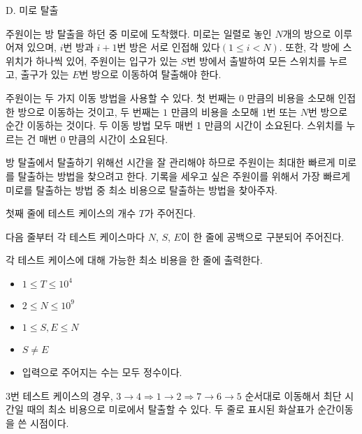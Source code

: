 \def\probtitle{미로 탈출}
\def\probno{D} %

\begin{problem}{\probno{}. \probtitle{}}

주원이는 방 탈출을 하던 중 미로에 도착했다. 미로는 일렬로 놓인 $N$개의 방으로 이루어져 있으며, $i$번 방과 $i+1$번 방은 서로 인접해 있다$(1 \leq i < N)$. 또한, 각 방에 스위치가 하나씩 있어, 주원이는 입구가 있는 $S$번 방에서 출발하여 모든 스위치를 누르고, 출구가 있는 $E$번 방으로 이동하여 탈출해야 한다.

주원이는 두 가지 이동 방법을 사용할 수 있다. 첫 번째는 $0$ 만큼의 비용을 소모해 인접한 방으로 이동하는 것이고, 두 번째는 $1$ 만큼의 비용을 소모해 $1$번 또는 $N$번 방으로 순간 이동하는 것이다. 두 이동 방법 모두 매번 1 만큼의 시간이 소요된다. 스위치를 누르는 건 매번 0 만큼의 시간이 소요된다.

방 탈출에서 탈출하기 위해선 시간을 잘 관리해야 하므로 주원이는 최대한 빠르게 미로를 탈출하는 방법을 찾으려고 한다. 기록을 세우고 싶은 주원이를 위해서 가장 빠르게 미로를 탈출하는 방법 중 최소 비용으로 탈출하는 방법을 찾아주자.

\InputFile

첫째 줄에 테스트 케이스의 개수 $T$가 주어진다.

다음 줄부터 각 테스트 케이스마다 $N$, $S$, $E$이 한 줄에 공백으로 구분되어 주어진다.

\OutputFile

각 테스트 케이스에 대해 가능한 최소 비용을 한 줄에 출력한다.

\Constraints

\begin{itemize}[topsep=0pt,noitemsep]
    \item $1 \leq T \leq 10^4$
    \item $2 \leq N \leq 10^9$
    \item $1 \leq S, E \leq N$
    \item $S \neq E$
    \item 입력으로 주어지는 수는 모두 정수이다.
\end{itemize}

\Example

\begin{example}
\end{example}

3번 테스트 케이스의 경우, $3 \rightarrow 4 \Rightarrow 1 \rightarrow 2 \Rightarrow 7 \rightarrow 6 \rightarrow 5$ 순서대로 이동해서 최단 시간일 때의 최소 비용으로 미로에서 탈출할 수 있다. 두 줄로 표시된 화살표가 순간이동을 쓴 시점이다.


\end{problem}